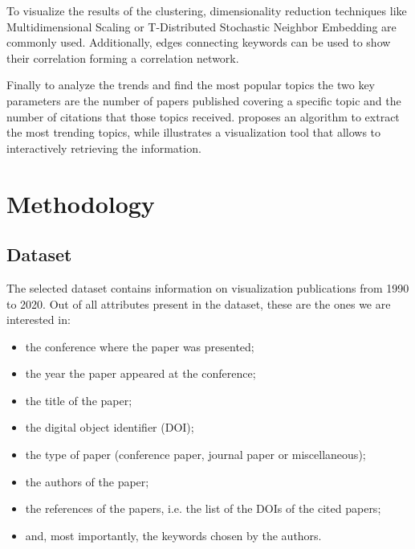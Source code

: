 \documentclass[11pt]{article}
\begin{document}
To visualize the results of the clustering, dimensionality reduction techniques like Multidimensional Scaling or T-Distributed Stochastic Neighbor Embedding are commonly used. Additionally, edges connecting keywords can be used to show their correlation forming a correlation network.

Finally to analyze the trends and find the most popular topics the two key parameters are the number of papers published covering a specific topic and the number of citations that those topics received. \cite{9079088} proposes an algorithm to extract the most trending topics, while \cite{9373186} illustrates a visualization tool that allows to interactively retrieving the information.

\section{Methodology} \label{sec:method}
\subsection{Dataset}
The selected dataset contains information on visualization publications from 1990 to 2020. Out of all attributes present in the dataset, these are the ones we are interested in:
\begin{itemize}
\item the conference where the paper was presented;
\item the year the paper appeared at the conference;
\item the title of the paper;
\item the digital object identifier (DOI);
\item the type of paper (conference paper, journal paper or miscellaneous);
\item the authors of the paper;
\item the references of the papers, i.e. the list of the DOIs of the cited papers;
\item and, most importantly, the keywords chosen by the authors.
\end{itemize}
\end{document}
